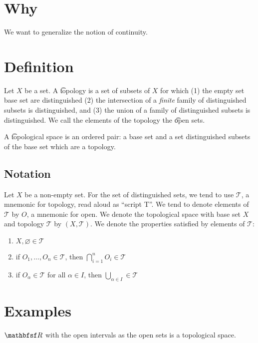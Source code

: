 

\section*{Why}

We want to generalize the notion of continuity.

\section*{Definition}

Let $X$ be a set.
A \t{topology} is a set of subsets of $X$ for which (1) the empty set base set are distinguished (2) the intersection of a \textit{finite} family of distinguished subsets is distinguished, and (3) the union of a family of distinguished subsets is distinguished.
We call the elements of the topology the \t{open sets}.

A \t{topological space} is an ordered pair: a base set and a set distinguished subsets of the base set which are a topology.

\subsection*{Notation}

Let $X$ be a non-empty set.
For the set of distinguished sets, we tend to use $\mathcal{T} $, a mnemonic for topology, read aloud as ``script T''.
We tend to denote elements of $\mathcal{T} $ by $O$, a mnemonic for open.
We denote the topological space with base set $X$ and topology $\mathcal{T} $ by $(X, \mathcal{T} )$.
We denote the properties satisfied by elements of $\mathcal{T} $:
    \begin{enumerate}
      \item $X, \varnothing \in \mathcal{T} $
      \item if $O_1, \dots , O_n \in \mathcal{T} $, then $\bigcap_{i = 1}^{n} O_i \in \mathcal{T} $
      \item if $O_\alpha  \in \mathcal{T} $ for all $\alpha  \in I$, then $\bigcup_{\alpha  \in I} \in \mathcal{T} $
    \end{enumerate}

\section*{Examples}

$\R $ with the open intervals as the open sets is a topological space.
